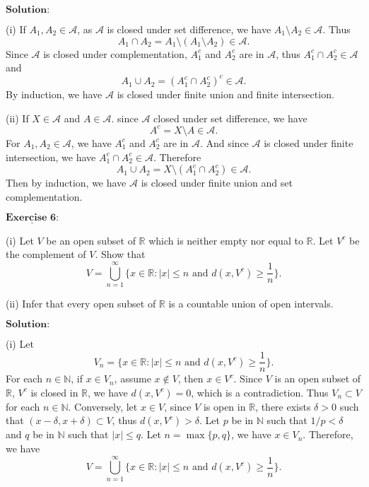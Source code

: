 \documentclass[12pt,a4paper]{ctexart}
\begin{document}
\vspace{8pt}
$\textbf{Solution:}$

(i) If $A_1, A_2 \in \mathcal A$, as $\mathcal A$ is closed under set difference, we have $A_1 \setminus A_2 \in \mathcal A$. Thus
$$ A_1 \cap A_2 = A_1 \setminus (A_1 \setminus A_2) \in \mathcal A.$$
Since $\mathcal A$ is closed under complementation, $A_1^c$ and $A_2^c$ are in $\mathcal A$, thus $A_1^c \cap A_2^c \in \mathcal A$ and
$$A_1 \cup A_2 = (A_1^c \cap A_2^c)^c \in \mathcal A.$$
By induction, we have $\mathcal A$ is closed under finite union and finite intersection.

(ii) If $X \in \mathcal A$ and $A \in \mathcal A$. since $\mathcal A$ closed under set difference, we have
$$A^c = X \setminus A \in \mathcal A. $$
For $A_1, A_2 \in \mathcal A$, we have $A_1^c$ and $A_2^c$ are in $\mathcal A$. And since $\mathcal A$ is closed under finite intersection, we have $A_1^c \cap A_2^c \in \mathcal A$. Therefore
$$A_1 \cup A_2 = X \setminus (A_1^c \cap A_2^c) \in \mathcal A.$$
Then by induction, we have $\mathcal A$ is closed under finite union and set complementation.



\newpage

$\underline{\textbf{Exercise 6:}}$

(i) Let $V$ be an open subset of $\mathbb R$ which is neither empty nor equal to $\mathbb R$. Let $V^c$ be the complement of $V$. Show that
$$V = \bigcup_{n=1}^{\infty} \{x \in \mathbb R: |x| \leq n \,\, \text{and} \,\, d(x, V^c) \geq \frac{1}{n} \}.$$

(ii) Infer that every open subset of $\mathbb R$ is a countable union of open intervals.

\vspace{8pt}
$\textbf{Solution:}$

(i) Let
$$V_n = \{x \in \mathbb R: |x| \leq n \,\, \text{and} \,\, d(x, V^c) \geq \frac{1}{n} \}.$$
For each $n \in \mathbb N$, if $x \in V_n$, assume $x \notin V$, then $x \in V^c$. Since  $V$ is an open subset of $\mathbb R$, $V^c$ is closed in $\mathbb R$, we have $d(x, V^c) = 0$, which is a contradiction. Thus $V_n \subset V$ for each $n \in \mathbb N$. Conversely, let $x \in V$, since $V$ is open in $\mathbb R$, there exists $\delta > 0$ such that $(x - \delta, x + \delta) \subset V$, thus $d(x, V^c) > \delta$. Let $p$ be in $\mathbb N$ such that $1/p < \delta$ and $q$ be in $\mathbb N$ such that $|x| \leq q$. Let $n = \max \{p, q\}$, we have $x \in V_n$. Therefore, we have 
$$V = \bigcup_{n=1}^{\infty} \{x \in \mathbb R: |x| \leq n \,\, \text{and} \,\, d(x, V^c) \geq \frac{1}{n} \}.$$
\end{document}
